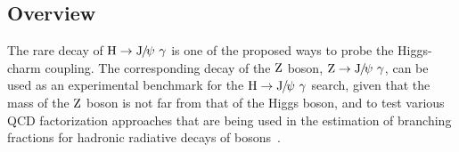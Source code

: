 \subsection{Overview}
The rare decay of $\PH\to\JPsi\ \gamma$ is one of the proposed ways to probe the Higgs-charm coupling. The corresponding decay of the $\mathrm{Z}$ boson, $\mathrm{Z}\to{\mathrm{J}\hspace{-.08em}/\hspace{-.14em}\psi}\ \gamma$, can be used as an experimental benchmark for the $\PH\to\JPsi\ \gamma$ search, given that the mass of the $\mathrm{Z}$ boson is not far from that of the Higgs boson, and to test various QCD factorization approaches that are being used in the estimation of branching fractions for hadronic radiative decays of bosons~\cite{GUBERINA1980317,PhysRevD.92.014007,Grossmann:2015lea}.

